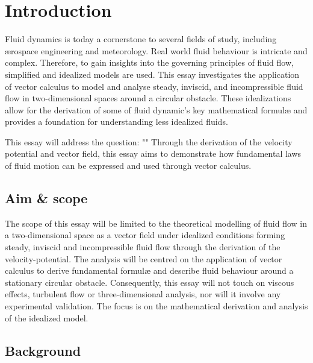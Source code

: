 \section{Introduction}
Fluid dynamics is today a cornerstone to several fields of study, including ærospace engineering and meteorology.
Real world fluid behaviour is intricate and complex. Therefore, to gain insights into the governing principles of
fluid flow, simplified and idealized models are used. This essay investigates the application of vector calculus
to model and analyse steady, inviscid, and incompressible fluid flow in two-dimensional spaces around a circular
obstacle. These idealizations allow for the derivation of some of fluid dynamic's key mathematical formulæ and
provides a foundation for understanding less idealized fluids.

This essay will address the question: "\researchquestion" Through the derivation of the velocity potential and
vector field, this essay aims to demonstrate how fundamental laws of fluid motion can be expressed and used through
vector calculus.

\subsection{Aim \& scope}
The scope of this essay will be limited to the theoretical modelling of fluid flow in a two-dimensional space
as a vector field under idealized conditions forming steady, inviscid and incompressible fluid flow through the 
derivation of the velocity-potential. The analysis will be centred on the application of vector calculus to derive
fundamental formulæ and describe fluid behaviour around a stationary circular obstacle. Consequently, this essay
will not touch on viscous effects, turbulent flow or three-dimensional analysis, nor will it involve any experimental 
validation. The focus is on the mathematical derivation and analysis of the idealized model.

\subsection{Background}
